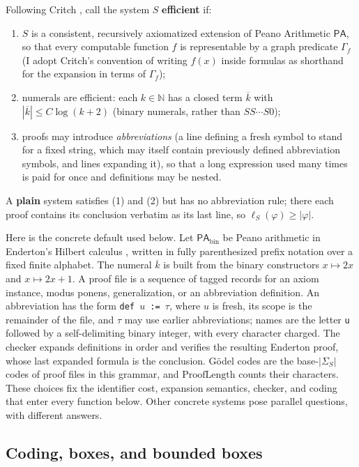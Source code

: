 \documentclass[11pt]{amsart}
\theoremstyle{plain}
\theoremstyle{definition}
\newcommand{\PA}{\mathsf{PA}}
\newcommand{\PAbin}{\mathsf{PA}_{\mathrm{bin}}}
\newcommand{\num}[1]{\overline{#1}}
\begin{document}
Following Critch \cite{critch2016}, call the system $S$ \textbf{efficient} if:
\begin{enumerate}
\item $S$ is a consistent, recursively axiomatized extension of Peano Arithmetic $\PA$, so that every computable function $f$ is representable by a graph predicate $\Gamma_f$ (I adopt Critch's convention of writing $f(x)$ inside formulas as shorthand for the expansion in terms of $\Gamma_f$);
\item numerals are efficient: each $k \in \mathbb{N}$ has a closed term $\num{k}$ with $|\num{k}| \le C\log(k+2)$ (binary numerals, rather than $SS\cdots S0$);
\item proofs may introduce \emph{abbreviations} (a line defining a fresh symbol to stand for a fixed string, which may itself contain previously defined abbreviation symbols, and lines expanding it), so that a long expression used many times is paid for once and definitions may be nested.
\end{enumerate}
A \textbf{plain} system satisfies (1) and (2) but has no abbreviation rule; there each proof contains its conclusion verbatim as its last line, so $\ell_S(\varphi) \ge |\varphi|$.

Here is the concrete default used below. Let $\PAbin$ be Peano arithmetic in Enderton's Hilbert calculus \cite{enderton2001}, written in fully parenthesized prefix notation over a fixed finite alphabet. The numeral $\num{k}$ is built from the binary constructors $x\mapsto 2x$ and $x\mapsto 2x+1$. A proof file is a sequence of tagged records for an axiom instance, modus ponens, generalization, or an abbreviation definition. An abbreviation has the form \texttt{def $u$ := $\tau$}, where $u$ is fresh, its scope is the remainder of the file, and $\tau$ may use earlier abbreviations; names are the letter \texttt{u} followed by a self-delimiting binary integer, with every character charged. The checker expands definitions in order and verifies the resulting Enderton proof, whose last expanded formula is the conclusion. G\"odel codes are the base-$|\Sigma_S|$ codes of proof files in this grammar, and $\mathrm{ProofLength}$ counts their characters. These choices fix the identifier cost, expansion semantics, checker, and coding that enter every function below. Other concrete systems pose parallel questions, with different answers.

\subsection{Coding, boxes, and bounded boxes}
\label{sec:coding}
\end{document}

